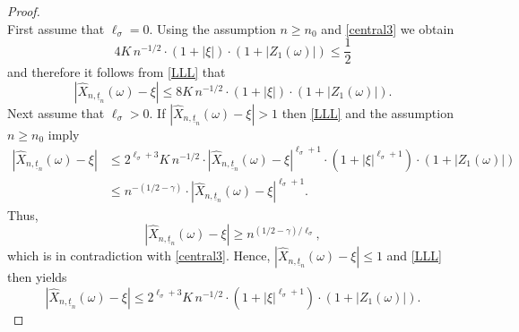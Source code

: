 \documentclass[11pt]{amsart}
\newcommand{\eul}{{\widehat X}}
\newcommand{\utn}{\underline {t}_n}
\theoremstyle{plain}
\theoremstyle{definition}
\begin{document}
\begin{proof}
\begin{equation}
\end{equation}
First assume that $\ell_\sigma=0$. Using the assumption $n\geq n_0$ and \eqref{central3} we obtain
\[
4K\,n^{-1/2}\cdot(1+|\xi|)\cdot (1+  |Z_1(\omega)|)\leq \frac{1}{2}
\]
and therefore it follows from \eqref{LLL} that
\begin{equation}\label{LLL1}
|\eul_{n,\utn}(\omega) -\xi|\le 8K\,n^{-1/2}\cdot(1+|\xi|)\cdot (1+  |Z_1(\omega)|).
\end{equation}
 Next assume that $\ell_\sigma>0$.
If $|\eul_{n,\utn}(\omega) -\xi|> 1$ then \eqref{LLL} and the assumption $n \geq n_0$  imply
\begin{align*}
|\eul_{n,\utn}(\omega) -\xi|  &\le 2^{\ell_\sigma+3}K\,n^{-1/2}\cdot |\eul_{n,\utn}(\omega)-\xi|^{\ell_\sigma+1}\cdot(1+|\xi|^{\ell_\sigma+1})\cdot (1+  |Z_1(\omega)|)\\
&\leq n^{-(1/2-\gamma)}\cdot |\eul_{n,\utn}(\omega)-\xi|^{\ell_\sigma+1}.
\end{align*}
Thus,
\[
|\eul_{n,\utn}(\omega)-\xi|\geq n^{(1/2-\gamma)/{\ell_\sigma}},
\]
which is in contradiction with \eqref{central3}. Hence, $|\eul_{n,\utn}(\omega) -\xi|\leq 1$ and   \eqref{LLL} then yields
\begin{equation}\label{central4}
|\eul_{n,\utn}(\omega) -\xi|  \le 2^{\ell_\sigma+3}K\,n^{-1/2}\cdot(1+|\xi|^{\ell_\sigma+1})\cdot (1+  |Z_1(\omega)|).
\end{equation}


\end{proof}
\end{document}
